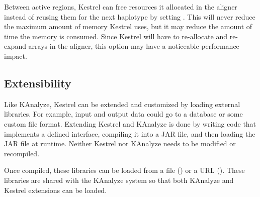 Between active regions, Kestrel can free resources it allocated in the aligner instead of reusing them for the next haplotype by setting . This will never reduce the maximum amount of memory Kestrel uses, but it may reduce the amount of time the memory is consumed. Since Kestrel will have to re-allocate and re-expand arrays in the aligner, this option may have a noticeable performance impact.

\subsection{Extensibility}
\label{sec.process.libs}

Like KAnalyze, Kestrel can be extended and customized by loading external libraries. For example, input and output data could go to a database or some custom file format. Extending Kestrel and KAnalyze is done by writing code that implements a defined interface, compiling it into a JAR file, and then loading the JAR file at runtime. Neither Kestrel nor KAnalyze needs to be modified or recompiled.

Once compiled, these libraries can be loaded from a file () or a URL (). These libraries are shared with the KAnalyze system so that both KAnalyze and Kestrel extensions can be loaded.
